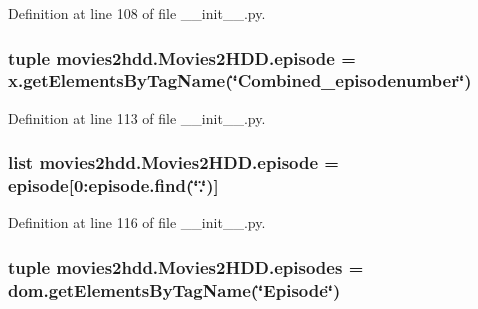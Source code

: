 Definition at line 108 of file \-\_\-\-\_\-init\-\_\-\-\_\-.\-py.

\hypertarget{classmovies2hdd_1_1_movies2_h_d_d_af69365988574fd1f1f66bfd372bd526c}{
\subsubsection[{episode}]{\setlength{\rightskip}{0pt plus 5cm}tuple movies2hdd.\-Movies2\-H\-D\-D.\-episode = x.\-get\-Elements\-By\-Tag\-Name(\char`\"{}Combined\-\_\-episodenumber\char`\"{})\hspace{0.3cm}{\ttfamily [static]}}}\label{classmovies2hdd_1_1_movies2_h_d_d_af69365988574fd1f1f66bfd372bd526c}


Definition at line 113 of file \-\_\-\-\_\-init\-\_\-\-\_\-.\-py.

\hypertarget{classmovies2hdd_1_1_movies2_h_d_d_ae6cedc0a37fc3d9c391cc0f6bcf872da}{
\subsubsection[{episode}]{\setlength{\rightskip}{0pt plus 5cm}list movies2hdd.\-Movies2\-H\-D\-D.\-episode = episode\mbox{[}0\-:episode.\-find(\char`\"{}.\char`\"{})\mbox{]}\hspace{0.3cm}{\ttfamily [static]}}}\label{classmovies2hdd_1_1_movies2_h_d_d_ae6cedc0a37fc3d9c391cc0f6bcf872da}


Definition at line 116 of file \-\_\-\-\_\-init\-\_\-\-\_\-.\-py.

\hypertarget{classmovies2hdd_1_1_movies2_h_d_d_adebd8de5fde82e9d8b512a03892442d1}{
\subsubsection[{episodes}]{\setlength{\rightskip}{0pt plus 5cm}tuple movies2hdd.\-Movies2\-H\-D\-D.\-episodes = dom.\-get\-Elements\-By\-Tag\-Name(\char`\"{}Episode\char`\"{})\hspace{0.3cm}{\ttfamily [static]}}}\label{classmovies2hdd_1_1_movies2_h_d_d_adebd8de5fde82e9d8b512a03892442d1}


